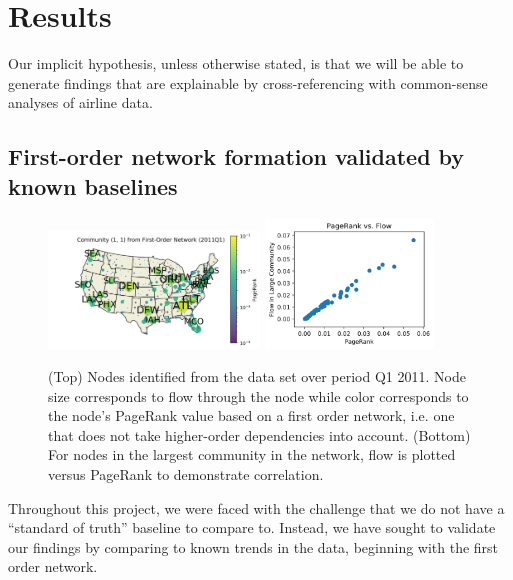 \documentclass[sigconf]{acmart}
\begin{document}
\section{Results} \label{sec:experiments}
Our implicit hypothesis, unless otherwise stated, is that we will be able to generate findings that are explainable by cross-referencing with common-sense analyses of airline data.

\subsection{First-order network formation validated by known baselines}

\begin{figure}
    \centering
    \includegraphics[width=0.5\textwidth]{figs/PageRank_fon_map.png}
    \includegraphics[width=0.4\textwidth]{figs/PageRank_v_flow.png}
    \caption{(Top) Nodes identified from the data set over period Q1 2011. Node size corresponds to flow through the node while color corresponds to the node's PageRank value based on a first order network, i.e. one that does not take higher-order dependencies into account. (Bottom) For nodes in the largest community in the network, flow is plotted versus PageRank to demonstrate correlation.} 
    \label{fig:fon_pagerank}
\end{figure}

Throughout this project, we were faced with the challenge that we do not have a ``standard of truth'' baseline to compare to. Instead, we have sought to validate our findings by comparing to known trends in the data, beginning with the first order network.
\end{document}
